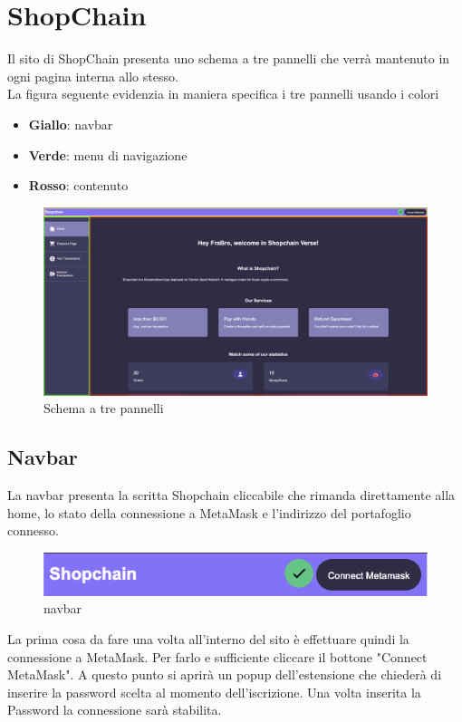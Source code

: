 \section{ShopChain}
Il sito di ShopChain presenta uno schema a tre pannelli che verrà mantenuto in ogni pagina interna allo stesso.\\
La figura seguente evidenzia in maniera specifica i tre pannelli usando i colori
\begin{itemize}
    \item \textbf{Giallo}: navbar
    \item \textbf{Verde}: menu di navigazione
    \item \textbf{Rosso}: contenuto
\end{itemize}
\begin{figure}[H]
    \centering
    \includegraphics[scale=0.2]{immagini/trePannelli.png}
    \caption{Schema a tre pannelli}
\end{figure}


    \subsection{Navbar}
    La navbar presenta la scritta Shopchain cliccabile che rimanda direttamente alla home, lo stato della connessione a MetaMask e l'indirizzo del portafoglio connesso.
    \begin{figure}[H]
        \centering
        \includegraphics[scale=0.5]{immagini/navbar.png}
        \caption{navbar}
    \end{figure}

    La prima cosa da fare una volta all'interno del sito è effettuare quindi la connessione a MetaMask. Per farlo e sufficiente cliccare il bottone "Connect MetaMask". A questo punto si aprirà un popup dell'estensione che chiederà di inserire la password scelta al momento dell'iscrizione. Una volta inserita la Password la connessione sarà stabilita.\\

